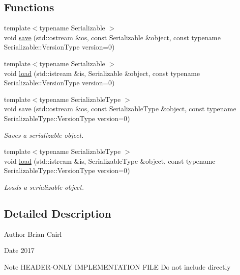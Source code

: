 \subsection*{Functions}
\begin{DoxyCompactItemize}
\item 
{\footnotesize template$<$typename Serializable $>$ }\\void \hyperlink{namespaceffnn_a1d292f830b9e27ce3965b0c18231b7fc}{save} (std\-::ostream \&os, const Serializable \&object, const typename Serializable\-::\-Version\-Type version=0)
\item 
{\footnotesize template$<$typename Serializable $>$ }\\void \hyperlink{namespaceffnn_a365753310c86d8142fa5b785cc16004a}{load} (std\-::istream \&is, Serializable \&object, const typename Serializable\-::\-Version\-Type version=0)
\item 
{\footnotesize template$<$typename Serializable\-Type $>$ }\\void \hyperlink{namespaceffnn_a25c692ab6bf9799deb7c4282ee85bdd6}{save} (std\-::ostream \&os, const Serializable\-Type \&object, const typename Serializable\-Type\-::\-Version\-Type version=0)
\begin{DoxyCompactList}\small\item\em Saves a serializable object. \end{DoxyCompactList}\item 
{\footnotesize template$<$typename Serializable\-Type $>$ }\\void \hyperlink{namespaceffnn_a94ff5b786bc42fa02bcf27ed86854a71}{load} (std\-::istream \&is, Serializable\-Type \&object, const typename Serializable\-Type\-::\-Version\-Type version=0)
\begin{DoxyCompactList}\small\item\em Loads a serializable object. \end{DoxyCompactList}\end{DoxyCompactItemize}


\subsection{Detailed Description}
\begin{DoxyAuthor}{Author}
Brian Cairl 
\end{DoxyAuthor}
\begin{DoxyDate}{Date}
2017
\end{DoxyDate}
\begin{DoxyNote}{Note}
H\-E\-A\-D\-E\-R-\/\-O\-N\-L\-Y I\-M\-P\-L\-E\-M\-E\-N\-T\-A\-T\-I\-O\-N F\-I\-L\-E  Do not include directly 
\end{DoxyNote}


